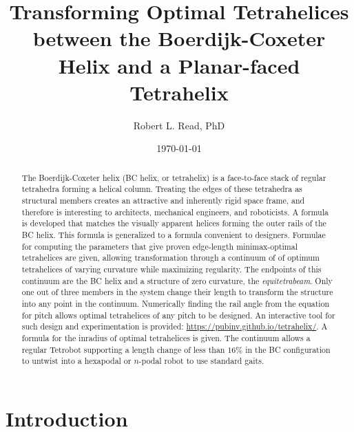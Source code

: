 \documentclass[10pt,final]{journals-1.0/asme2ej}
\title{Transforming Optimal Tetrahelices between the Boerdijk-Coxeter Helix and a Planar-faced Tetrahelix}
\author{Robert L. Read, PhD
  \affiliation{
    Founder, Public Invention \\
    Austin, TX, 78704 \\
    Email: \href{mailto:read.robert@gmail.com}{read.robert@gmail.com} 
    }
}
\date{\today}
\begin{document}
\maketitle



\begin{abstract}
  The Boerdijk-Coxeter helix (BC helix, or tetrahelix) is a
  face-to-face stack of regular tetrahedra forming a helical column.  Treating the edges of
  these tetrahedra as structural members creates an attractive and
  inherently rigid space frame, and therefore is interesting to architects,
  mechanical engineers, and roboticists.  A formula is developed that matches the
  visually apparent helices forming the outer rails of the BC helix.
  This formula is generalized to a formula convenient to designers.
  Formulae for 
  computing the
  parameters that give proven edge-length minimax-optimal tetrahelices
  are given,
  allowing transformation through a continuum of 
  of optimum tetrahelices of varying curvature while maximizing regularity.
  The endpoints of this continuum are the BC helix and
  a structure of zero curvature, the \emph{equitetrabeam}.
 Only one out of three members in the system change their length to transform
  the structure into
  any point in the continuum.
  Numerically finding the rail angle from the equation for
  pitch allows optimal tetrahelices of any pitch to be designed. 
  An interactive tool for such design and experimentation is provided: \url{https://pubinv.github.io/tetrahelix/}.
  A formula for the inradius of optimal tetrahelices is given.
  The continuum allows a regular Tetrobot supporting a length change of less than $16\%$ in the
  BC configuration to untwist into a hexapodal or $n$-podal robot
  to use standard gaits.
\end{abstract}






\section{Introduction}
\end{document}
